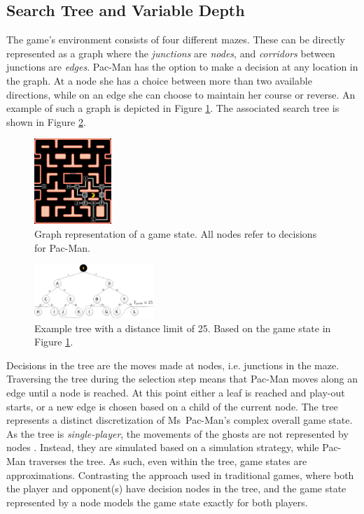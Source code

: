 \documentclass[journal]{IEEEtran}
\begin{document}
\subsection{Search Tree and Variable Depth \label{sec:stavd}}
The game's environment consists of four different mazes. These can be directly represented as a graph where the \emph{junctions} are \emph{nodes}, and \emph{corridors} between junctions are \emph{edges}. Pac-Man has the option to make a decision at any location in the graph. At a node she has a choice between more than two available directions, while on an edge she can choose to maintain her course or reverse. An example of such a graph is depicted in Figure \ref{fig:maze-gametree}. The associated search tree is shown in Figure \ref{fig:tree}.
\begin{figure}[hb]
	\centering
	\includegraphics[width=0.26\textwidth]{figure2.png}
	\caption{Graph representation of a game state. All nodes refer to decisions for Pac-Man.}
	\label{fig:maze-gametree}
\end{figure}
\begin{figure}[ht]
	\centering
	\includegraphics[width=0.4\textwidth]{figure3.png}
\vspace{-4pt}
	\caption{Example tree with a distance limit of 25. Based on the game state in Figure \ref{fig:maze-gametree}.}
	\label{fig:tree}
\vspace{-4pt}
\end{figure}

Decisions in the tree are the moves made at nodes, i.e. junctions in the maze. Traversing the tree during the selection step means that Pac-Man moves along an edge until a node is reached. At this point either a leaf is reached and play-out starts, or a new edge is chosen based on a child of the current node. The tree represents a distinct discretization of Ms~Pac-Man's complex overall game state. As the tree is \emph{single-player}, the movements of the ghosts are not represented by nodes \cite{ikehata2011monte}. Instead, they are simulated based on a simulation strategy, while Pac-Man traverses the tree. As such, even within the tree, game states are approximations. Contrasting the approach used in traditional games, where both the player and opponent(s) have decision nodes in the tree, and the game state represented by a node models the game state exactly for both players.
\end{document}
